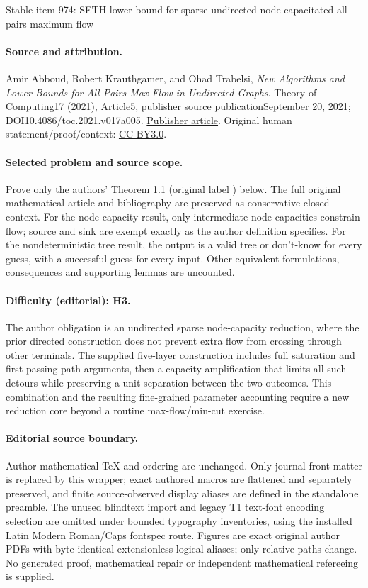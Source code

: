 \documentclass[11pt]{article}
\numberwithin{equation}{section}
\theoremstyle{definition}
\theoremstyle{plain}
\theoremstyle{plain}
\begin{document}
\begin{center}{\Large Stable item 974: SETH lower bound for sparse undirected node-capacitated all-pairs maximum flow}\end{center}
\paragraph{Source and attribution.}
Amir Abboud, Robert Krauthgamer, and Ohad Trabelsi, \emph{New Algorithms and Lower Bounds for All-Pairs Max-Flow in Undirected Graphs}. Theory of Computing17 (2021), Article5, publisher source publicationSeptember 20, 2021; DOI10.4086/toc.2021.v017a005. \href{https://theoryofcomputing.org/articles/v017a005/}{Publisher article}. Original human statement/proof/context: \href{https://creativecommons.org/licenses/by/3.0/}{CC BY3.0}.
\paragraph{Selected problem and source scope.}
Prove only the authors' Theorem 1.1 (original label ) below. The full original mathematical article and bibliography are preserved as conservative closed context. For the node-capacity result, only intermediate-node capacities constrain flow; source and sink are exempt exactly as the author definition specifies. For the nondeterministic tree result, the output is a valid tree or don't-know for every guess, with a successful guess for every input. Other equivalent formulations, consequences and supporting lemmas are uncounted.
\paragraph{Difficulty (editorial): H3.}
The author obligation is an undirected sparse node-capacity reduction, where the prior directed construction does not prevent extra flow from crossing through other terminals. The supplied five-layer construction includes full saturation and first-passing path arguments, then a capacity amplification that limits all such detours while preserving a unit separation between the two outcomes. This combination and the resulting fine-grained parameter accounting require a new reduction core beyond a routine max-flow/min-cut exercise.
\paragraph{Editorial source boundary.}
Author mathematical TeX and ordering are unchanged. Only journal front matter is replaced by this wrapper; exact authored macros are flattened and separately preserved, and finite source-observed display aliases are defined in the standalone preamble. The unused blindtext import and legacy T1 text-font encoding selection are omitted under bounded typography inventories, using the installed Latin Modern Roman/Caps fontspec route. Figures are exact original author PDFs with byte-identical extensionless logical aliases; only relative paths change. No generated proof, mathematical repair or independent mathematical refereeing is supplied. 
\clearpage
\end{document}
